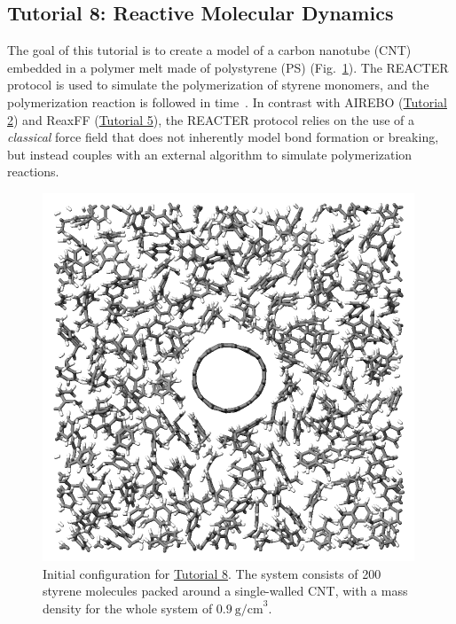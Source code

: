 \documentclass[9pt,tutorial]{livecoms}
\begin{document}
\subsection{Tutorial 8: Reactive Molecular Dynamics}
\label{bond-react-label}

The goal of this tutorial is to create a model of a carbon nanotube (CNT) embedded
in a polymer melt made of polystyrene (PS) (Fig.~\ref{fig:REACT}).  The
REACTER protocol is used to simulate the polymerization of styrene monomers, and the
polymerization reaction is followed in time~\cite{gissinger2017polymer, gissinger2020reacter, gissinger2024molecular}.
In contrast with AIREBO (\hyperref[carbon-nanotube-label]{Tutorial 2})
and ReaxFF (\hyperref[reactive-silicon-dioxide-label]{Tutorial 5}), the REACTER
protocol relies on the use of a \textit{classical} force field
{\color{blue}that does not inherently model bond formation or breaking, but
instead couples with an external algorithm to simulate polymerization reactions.}

\begin{figure}
\centering
\includegraphics[width=\linewidth]{REACT.png}
\caption{Initial configuration for \hyperref[bond-react-label]{Tutorial 8}.
The system consists of 200 styrene molecules packed around a single-walled
CNT, with a mass density for the whole system of $0.9~\text{g/cm}^3$.}
\label{fig:REACT}
\end{figure}
\end{document}
